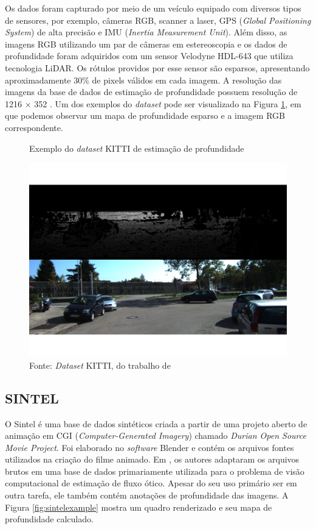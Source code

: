 Os dados foram capturado por meio de um veículo equipado com diversos tipos de sensores, por exemplo, câmeras RGB, scanner a laser, GPS (\textit{Global Positioning System}) de alta precisão e IMU (\textit{Inertia Measurement Unit}). Além disso, as imagens RGB utilizando um par de câmeras em estereoscopia e os dados de profundidade foram adquiridos com um sensor Velodyne HDL-643 que utiliza tecnologia LiDAR. Os rótulos providos por esse sensor são esparsos, apresentando aproximadamente 30\% de pixels válidos em cada imagem. A resolução das imagens da base de dados de estimação de profundidade possuem resolução de 1216 $\times$ 352 \cite{lahiri2024deep}. Um dos exemplos do \textit{dataset} pode ser visualizado na Figura \ref{fig:kittiexample}, em que podemos observar um mapa de profundidade esparso e a imagem RGB correspondente.

\begin{figure}[h]
    \centering
    \caption{Exemplo do \textit{dataset} KITTI de estimação de profundidade}
    \includegraphics[width=.8\textwidth]{fig/example_kitti.png}
    \caption*{Fonte: \textit{Dataset} KITTI, do trabalho de }
    \label{fig:kittiexample}
\end{figure}

\newpage

\subsection{SINTEL}

O Sintel é uma base de dados sintéticos criada a partir de uma projeto aberto de animação em CGI (\textit{Computer-Generated Imagery}) chamado \textit{Durian Open Source Movie Project}. Foi elaborado no \textit{software} Blender e contém os arquivos fontes utilizados na criação do filme animado. Em \cite{Butler:ECCV:2012}, os autores adaptaram os arquivos brutos em uma base de dados primariamente utilizada para o problema de visão computacional de estimação de fluxo ótico. Apesar do seu uso primário ser em outra tarefa, ele também contém anotações de profundidade das imagens. A Figura \ref{fig:sintelexample} mostra um quadro renderizado e seu mapa de profundidade calculado.


